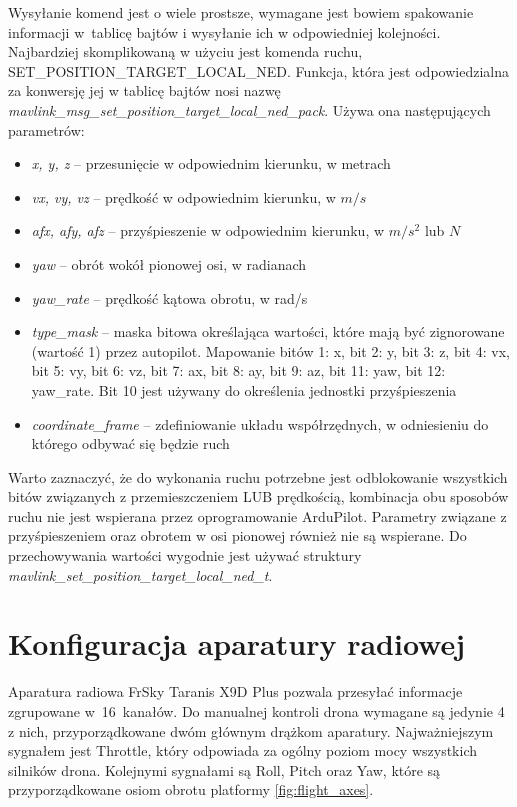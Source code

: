 Wysyłanie komend jest o wiele prostsze, wymagane jest bowiem spakowanie informacji w~tablicę bajtów i wysyłanie ich w odpowiedniej kolejności.
Najbardziej skomplikowaną w użyciu jest komenda ruchu, SET\_POSITION\_TARGET\_LOCAL\_NED. 
Funkcja, która jest odpowiedzialna za konwersję jej w tablicę bajtów nosi nazwę \textit{mavlink\_msg\_set\_position\_target\_local\_ned\_pack}. Używa ona następujących parametrów:
\begin{itemize}
	\item \textit{x, y, z} -- przesunięcie w odpowiednim kierunku, w metrach
	\item \textit{vx, vy, vz} -- prędkość w odpowiednim kierunku, w $m/s$
	\item \textit{afx, afy, afz} -- przyśpieszenie w odpowiednim kierunku, w $m/s^2$ lub $N$
	\item \textit{yaw} -- obrót wokół pionowej osi, w radianach
	\item \textit{yaw\_rate} -- prędkość kątowa obrotu, w rad/s
	\item \textit{type\_mask} -- maska bitowa określająca wartości, które mają być zignorowane (wartość 1) przez autopilot. Mapowanie bitów 1: x, bit 2: y, bit 3: z, bit 4: vx, bit 5: vy, bit 6: vz, bit 7: ax, bit 8: ay, bit 9: az, bit 11: yaw, bit 12: yaw\_rate. Bit 10 jest używany do określenia jednostki przyśpieszenia
	\item \textit{coordinate\_frame} -- zdefiniowanie układu współrzędnych, w odniesieniu do którego odbywać się będzie ruch
\end{itemize}

Warto zaznaczyć, że do wykonania ruchu potrzebne jest odblokowanie wszystkich bitów związanych z przemieszczeniem LUB prędkością, kombinacja obu sposobów ruchu nie jest wspierana przez oprogramowanie ArduPilot. 
Parametry związane z przyśpieszeniem oraz obrotem w osi pionowej również nie są wspierane.
Do przechowywania wartości wygodnie jest używać struktury \textit{mavlink\_set\_position\_target\_local\_ned\_t}.

\section{Konfiguracja aparatury radiowej}

Aparatura radiowa FrSky Taranis X9D Plus pozwala przesyłać informacje zgrupowane w~16~kanałów. 
Do manualnej kontroli drona wymagane są jedynie 4 z nich, przyporządkowane dwóm głównym drążkom aparatury. 
Najważniejszym sygnałem jest Throttle, który odpowiada za ogólny poziom mocy wszystkich silników drona. 
Kolejnymi sygnałami są Roll, Pitch oraz Yaw, które są przyporządkowane osiom obrotu platformy \ref{fig:flight_axes}. %

